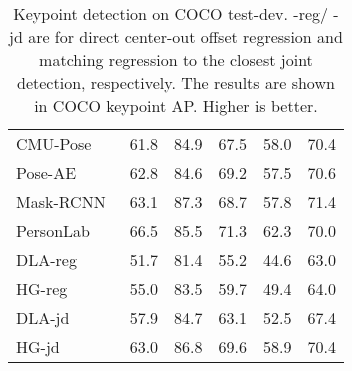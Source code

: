 \documentclass[10pt,twocolumn,letterpaper]{article}
\begin{document}
\setlength{\tabcolsep}{2pt}
\begin{table}[t]
\centering
\begin{tabular}{l@{\ \ }c@{\ \ }c@{\ \ }c@{\ \ }c@{\ \ }c}
\hline
&  &  &  &  &  \\
\hline
CMU-Pose~\cite{cao2017realtime} & 61.8 & 84.9 & 67.5 & 58.0 & 70.4 \\
Pose-AE~\cite{newell2017associative} & 62.8 & 84.6 & 69.2 & 57.5 & 70.6 \\
Mask-RCNN~\cite{he2017mask} & 63.1 & 87.3 & 68.7 & 57.8 & 71.4 \\
PersonLab~\cite{papandreou2018personlab} & 66.5 & 85.5 & 71.3 & 62.3 & 70.0 \\
\hline
DLA-reg & 51.7 & 81.4 & 55.2 & 44.6 & 63.0 \\
HG-reg & 55.0 & 83.5 & 59.7 & 49.4 & 64.0 \\
DLA-jd & 57.9 & 84.7 & 63.1 & 52.5 & 67.4 \\
HG-jd & 63.0 & 86.8 & 69.6 & 58.9 & 70.4 \\
\hline
\end{tabular}
\caption{Keypoint detection on COCO test-dev. -reg/ -jd are for direct center-out offset regression and matching regression to the closest joint detection, respectively. The results are shown in COCO keypoint AP. Higher is better.}
\label{table:human}
\vspace{-1em}
\end{table}
\setlength{\tabcolsep}{1.4pt}
\end{document}
